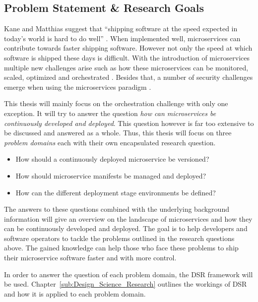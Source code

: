 
\subsection{Problem Statement \& Research Goals}%
\label{sub:Problem_Statement}

Kane and Matthias suggest that \enquote{shipping software at the speed expected
in today's world is hard to do well} \autocite[p.
2]{SeanPKaneDocker&Running2018}. When implemented well, microservices can
contribute towards faster shipping software. However not only the speed at
which software is shipped these days is difficult. With the introduction of
microservices multiple new challenges arise such as how these microservices can
be monitored, scaled, optimized and orchestrated \autocite[p.
67]{TrihinasDevOpsasService2018}. Besides that, a number of security challenges
emerge when using the microservices paradigm
\autocite{YaryginaOvercomingSecurityChallenges2018}.

This thesis will mainly focus on the orchestration challenge with only one
exception. It will try to answer the question \textit{how can microservices be
continuously developed and deployed}. This question however is far too
extensive to be discussed and answered as a whole. Thus, this thesis
will focus on three 
\textit{problem domains} each with their own encapsulated research question.

\label{link:problem_domains}
\begin{itemize}
  \item How should a continuously deployed microservice be versioned?
  \item How should microservice manifests be managed and deployed?
  \item How can the different deployment stage environments be defined?
\end{itemize}

The answers to these questions combined with the underlying background
information will give an overview on the landscape of microservices and how
they can be continuously developed and deployed. The goal is to help developers
and software operators to tackle the problems outlined in the research
questions above. The gained knowledge can help those who face these problems to
ship their microservice software faster and with more control.

In order to answer the question of each problem domain, the \ac{DSR} framework
will be used. Chapter~\ref{sub:Design_Science_Research} outlines the workings
of \ac{DSR} and how it is applied to each problem domain.
